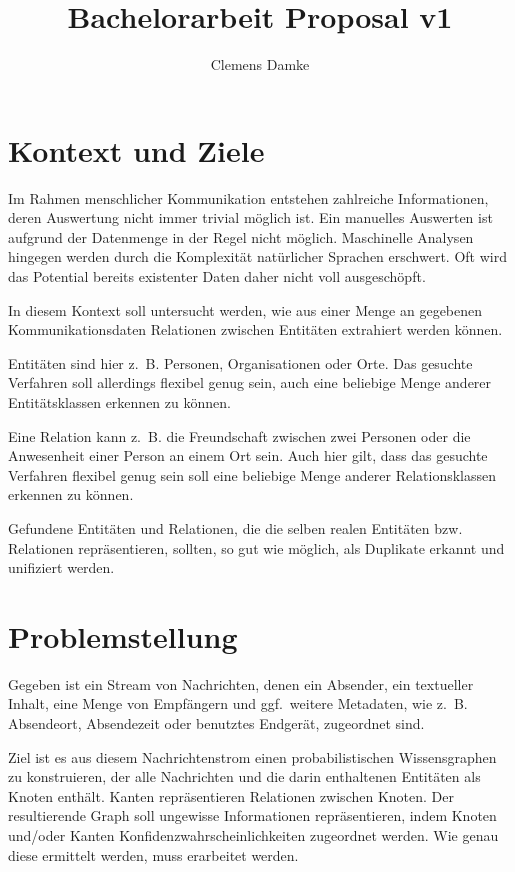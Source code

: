 \documentclass[12pt,a4paper,bibliography=totocnumbered,listof=totocnumbered]{scrartcl}
\title{Bachelorarbeit Proposal v1}
\author{Clemens Damke}
\begin{document}
{ \maketitle}

\section{Kontext und Ziele}

Im Rahmen menschlicher Kommunikation entstehen zahlreiche Informationen, deren Auswertung nicht immer trivial möglich ist. Ein manuelles Auswerten ist aufgrund der Datenmenge in der Regel nicht möglich. Maschinelle Analysen hingegen werden durch die Komplexität natürlicher Sprachen erschwert. Oft wird das Potential bereits existenter Daten daher nicht voll ausgeschöpft.

In diesem Kontext soll untersucht werden, wie aus einer Menge an gegebenen Kommunikationsdaten Relationen zwischen Entitäten extrahiert werden können.

Entitäten sind hier z.~B. Personen, Organisationen oder Orte. Das gesuchte Verfahren soll allerdings flexibel genug sein, auch eine beliebige Menge anderer Entitätsklassen erkennen zu können.

Eine Relation kann z.~B. die Freundschaft zwischen zwei Personen oder die Anwesenheit einer Person an einem Ort sein. Auch hier gilt, dass das gesuchte Verfahren flexibel genug sein soll eine beliebige Menge anderer Relationsklassen erkennen zu können.

Gefundene Entitäten und Relationen, die die selben realen Entitäten bzw. Relationen repräsentieren, sollten, so gut wie möglich, als Duplikate erkannt und unifiziert werden.


\section{Problemstellung}

Gegeben ist ein Stream von Nachrichten, denen ein Absender, ein textueller Inhalt, eine Menge von Empfängern und ggf.\ weitere Metadaten, wie z.~B. Absendeort, Absendezeit oder benutztes Endgerät, zugeordnet sind.

Ziel ist es aus diesem Nachrichtenstrom einen probabilistischen Wissensgraphen zu konstruieren, der alle Nachrichten und die darin enthaltenen Entitäten als Knoten enthält. Kanten repräsentieren Relationen zwischen Knoten. Der resultierende Graph soll ungewisse Informationen repräsentieren, indem Knoten und/oder Kanten Konfidenzwahrscheinlichkeiten zugeordnet werden. Wie genau diese ermittelt werden, muss erarbeitet werden.
\end{document}
